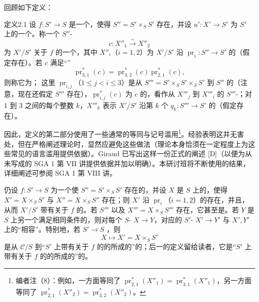 回顾如下定义：
\begin{SGAresult}{定义}{2.1}
设 $f:S'\to S$ 是一个，使得 $S''=S'\times_S S'$ 存在，并设 $u':X'\to S'$ 为 $S'$ 上的一个。称一个 $S''$-
\[
 c:X''_1\xrightarrow{\sim}X''_2
\]
为 $X'/S'$ 关于 $f$ 的一个，其中 $X''_i$（$i=1,2$）为 $X'/S'$ 沿 $\operatorname{pr}_i:S''\to S'$ 的（假定存在）。若 $c$ 满足“”
\[
 \operatorname{pr}_{3,1}^*(c)=\operatorname{pr}_{3,2}^*(c)\operatorname{pr}_{2,1}^*(c),
\]
则称它为；
这里 $\operatorname{pr}_{i,j}$（$1\le j<i\le3$）是从 $S'''=S'\times_S S'\times_S S'$ 到 $S''$ 的（注意，现在还假定 $S'''$ 存在），$\operatorname{pr}_{i,j}^*(c)$ 为 $c$ 的，看作从 $X'''_j$ 到 $X'''_i$ 的 $S'''$-；对 $1$ 到 $3$ 之间的每个整数 $k$，$X'''_k$ 表示 $X'/S'$ 沿第 $k$ 个 $q_k:S'''\to S'$ 的（假定存在）。
\end{SGAresult}
因此，定义的第二部分使用了一些通常的等同与记号滥用\footnote{编者注（8）：例如，一方面等同了 $\operatorname{pr}_{2,1}^*(X''_1)=\operatorname{pr}_{3,1}^*(X''_1)$，另一方面等同了 $\operatorname{pr}_{2,1}^*(X''_2)=\operatorname{pr}_{3,2}^*(X''_2)$。}。经验表明这并无害处，但在严格阐述理论时，显然应避免这些做法（理论本身恰须在一定程度上为这些常见的语言滥用提供依据）。Giraud 已写出这样一份正式的阐述 [D]（以便为从未写成的 SGA 1 第 VII 讲提供依据并加以明确）。本研讨班将不断使用的结果，详细阐述可参阅 SGA 1 第 VIII 讲。

仍设 $f:S'\to S$ 为一个使 $S''=S'\times_S S'$ 存在的，并设 $X$ 是 $S$ 上的，使得 $X'=X\times_S S'$ 与 $X''=X\times_S S''$ 存在；则 $X'$ 沿 $\operatorname{pr}_i$（$i=1,2$）的存在，并且，从而 $X'/S'$ 带有关于 $f$ 的。若 $S'''$ 以及 $X'''=X\times_S S'''$ 存在，它甚至是。若 $Y$ 是 $S$ 上另一个满足相同条件的，则对每个 $S$- $X\to Y$，对应的 $S'$- $X'\to Y'$ 与 $X',Y'$ 上的“相容”。特别地，若 $S'\to S$ ，则
\[
 X\longmapsto X'=X\times_S S'
\]
是从 $\mathcal C/S$ 到“$S'$ 上带有关于 $f$ 的的所成的”的；后一的定义留给读者，它是“$S'$ 上带有关于 $f$ 的的所成的”的。

